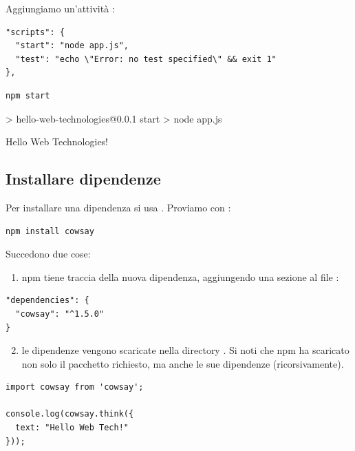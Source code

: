 Aggiungiamo un'attività :

\begin{lstlisting}[style=json, name=package.json]
"scripts": {
  "start": "node app.js",
  "test": "echo \"Error: no test specified\" && exit 1"
},
\end{lstlisting}

\begin{lstlisting}[style=shell]
npm start
\end{lstlisting}

\begin{console}[Terminale]
> hello-web-technologies@0.0.1 start
> node app.js

Hello Web Technologies!
\end{console}

\subsection{Installare dipendenze}

Per installare una dipendenza si usa .
Proviamo con :

\begin{lstlisting}[style=shell]
npm install cowsay
\end{lstlisting}

Succedono due cose:

\begin{enumerate}
  \item npm tiene traccia della nuova dipendenza, aggiungendo una sezione al
        file :
\end{enumerate}

\begin{lstlisting}[style=json]
"dependencies": {
  "cowsay": "^1.5.0"
}
\end{lstlisting}

\begin{enumerate}
  \setcounter{enumi}{1}
  \item le dipendenze vengono scaricate nella directory .
        Si noti che npm ha scaricato non solo il pacchetto richiesto, ma anche
        le sue dipendenze (ricorsivamente).
\end{enumerate}

\begin{lstlisting}[style=js, name=app.js]
import cowsay from 'cowsay';

console.log(cowsay.think({
  text: "Hello Web Tech!"
}));
\end{lstlisting}

